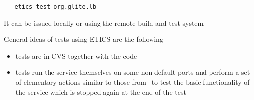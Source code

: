 \begin{verbatim}
   etics-test org.glite.lb
\end{verbatim}

It can be issued locally or using the remote build and test system.

General ideas of \LB tests using ETICS are the following

\begin{itemize}
\item tests are in CVS together with the code

\item tests run the service themselves on some non-default ports and perform a set of
elementary actions similar to those from \ctblb{}\ 
to test the basic functionality of the service which is stopped again at the
end of the test

\end{itemize}
